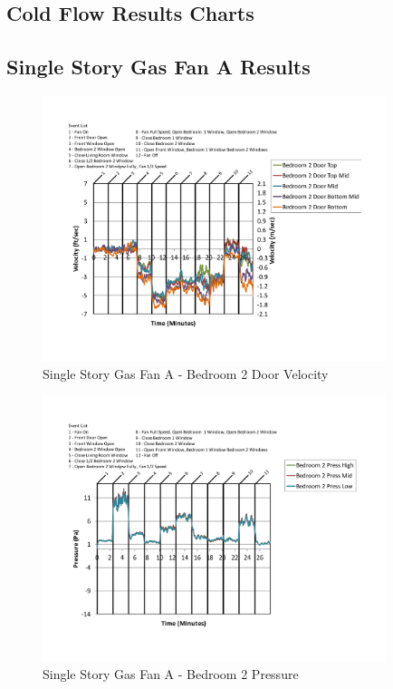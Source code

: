 \documentclass{article}
\begin{document}
\begin{appendices}

\renewcommand{\thesection}{\Alph{section}}


\section{Cold Flow Results Charts} \label{App:ColdFlowResults}

\subsection{Single Story Gas Fan A Results} \label{App:Single_StoryGasFanAResults} 

	\begin{figure}[H]
		\centering
		\includegraphics[height=3.05in,trim=0.67in 1.1in 0.67in 0.8in,clip=true]{0_Images/Results_Charts/ColdFlow/Single_Story/Gas/A/Bedroom_2_Door_Velocity.pdf}
		\caption{Single Story Gas Fan A - Bedroom 2 Door Velocity}
	\end{figure}
 

	\begin{figure}[H]
		\centering
		\includegraphics[height=3.05in,trim=0.67in 1.1in 0.67in 0.8in,clip=true]{0_Images/Results_Charts/ColdFlow/Single_Story/Gas/A/Bedroom_2_Pressure.pdf}
		\caption{Single Story Gas Fan A - Bedroom 2 Pressure}
	\end{figure}
 

\end{appendices}
\end{document}
